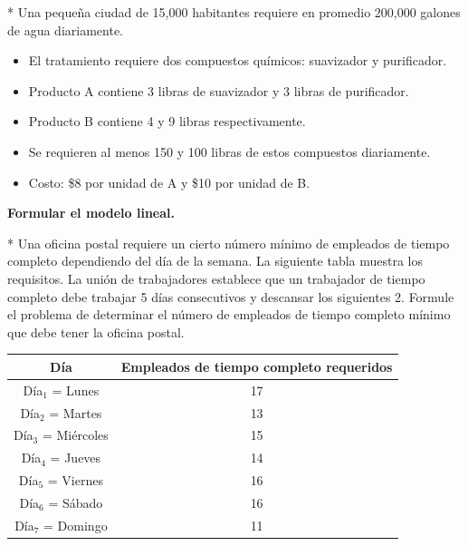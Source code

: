 \begin{Quest}*\label{Pregunta19}
Una peque\~na ciudad de 15,000 habitantes requiere en promedio 200,000 galones de agua diariamente.

\begin{itemize}
\item[a) ] El tratamiento requiere dos compuestos qu\'imicos: suavizador y purificador.

\item[b) ] Producto A contiene 3 libras de suavizador y 3 libras de purificador.  
\item[c) ] Producto B contiene 4 y 9 libras respectivamente.

\item[d) ] Se requieren al menos 150 y 100 libras de estos compuestos diariamente.

\item[e) ] Costo: \$8 por unidad de A y \$10 por unidad de B.
\end{itemize}
\textbf{Formular el modelo lineal.}
\end{Quest}


\begin{Quest}*\label{Pregunta20}
Una oficina postal requiere un cierto n\'umero m\'inimo de empleados de tiempo completo dependiendo del d\'ia de la semana. La siguiente tabla muestra los requisitos. La uni\'on de trabajadores establece que un trabajador de tiempo completo debe trabajar 5 d\'ias consecutivos y descansar los siguientes 2. Formule el problema de determinar el n\'umero de empleados de tiempo completo m\'inimo que debe tener la oficina postal.

\begin{center}
\begin{tabular}{|c|c|}
\hline
\textbf{D\'ia} & \textbf{Empleados de tiempo completo requeridos} \\
\hline
D\'ia$_1$ = Lunes & 17 \\
D\'ia$_2$ = Martes & 13 \\
D\'ia$_3$ = Mi\'ercoles & 15 \\
D\'ia$_4$ = Jueves & 14 \\
D\'ia$_5$ = Viernes & 16 \\
D\'ia$_6$ = S\'abado & 16 \\
D\'ia$_7$ = Domingo & 11 \\
\hline
\end{tabular}
\end{center}
\end{Quest}

